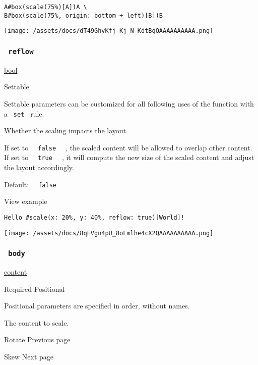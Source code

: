 \begin{verbatim}
A#box(scale(75%)[A])A \
B#box(scale(75%, origin: bottom + left)[B])B
\end{verbatim}

\texttt{[image: /assets/docs/dT49GhvKfj-Kj\_N\_KdtBqQAAAAAAAAAA.png]}

\subsubsection{\texorpdfstring{\texttt{\ reflow\ }}{ reflow }}\label{parameters-reflow}

\href{/docs/reference/foundations/bool/}{bool}

{{ Settable }}

\label{parameters-reflow-settable-tooltip}
Settable parameters can be customized for all following uses of the
function with a \texttt{\ set\ } rule.

Whether the scaling impacts the layout.

If set to \texttt{\ }{\texttt{\ false\ }}\texttt{\ } , the scaled
content will be allowed to overlap other content. If set to
\texttt{\ }{\texttt{\ true\ }}\texttt{\ } , it will compute the new size
of the scaled content and adjust the layout accordingly.

Default: \texttt{\ }{\texttt{\ false\ }}\texttt{\ }


View example

\begin{verbatim}
Hello #scale(x: 20%, y: 40%, reflow: true)[World]!
\end{verbatim}

\texttt{[image: /assets/docs/8qEVgn4pU\_8oLmlhe4cX2QAAAAAAAAAA.png]}

\subsubsection{\texorpdfstring{\texttt{\ body\ }}{ body }}\label{parameters-body}

\href{/docs/reference/foundations/content/}{content}

{Required} {{ Positional }}

\label{parameters-body-positional-tooltip}
Positional parameters are specified in order, without names.

The content to scale.

\href{/docs/reference/layout/rotate/}{\pandocbounded{}}

{ Rotate } { Previous page }

\href{/docs/reference/layout/skew/}{\pandocbounded{}}

{ Skew } { Next page }
